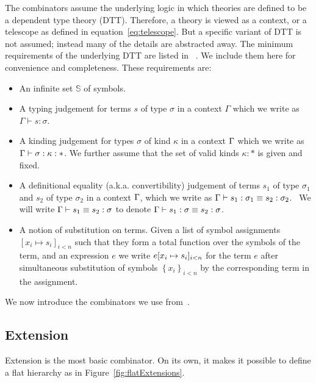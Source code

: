 The combinators assume the underlying logic in which theories are defined to be a dependent type theory (DTT). Therefore, a theory is viewed as a context, or a telescope as defined in equation~\ref{eq:telescope}. But a specific variant of DTT is not assumed; instead many of the details are abstracted away. The minimum requirements of the underlying DTT are listed in ~\cite{carette2018building}. We include them here for convenience and completeness. These requirements are:  
\begin{itemize}
    \item An infinite set $\mathbb{S}$ of symbols.
    
    \item A typing judgement for terms $s$ of type $\sigma$ in a context
    $\Gamma$ which we write as $\Gamma \vdash s : \sigma$.
    
    \item A kinding judgement for types $\sigma$ of kind $\kappa$ in a context
    $\Gamma$ which we write as \\
    $\Gamma \vdash \sigma : \kappa : *$.  We further assume that the set
    of valid kinds $\kappa : *$ is given and fixed.
    
    \item A definitional equality (a.k.a. convertibility) judgement of terms
    $s_1$ of type $\sigma_1$ and $s_2$ of type $\sigma_2$ in a context $\Gamma$,
    which we write as $\Gamma \vdash s_1 : \sigma_1 \equiv s_2 : \sigma_2$. \ We
    will write $\Gamma \vdash s_1 \equiv s_2 : \sigma$ to denote $\Gamma \vdash
    s_1 : \sigma \equiv s_2 : \sigma$.
    
    \item A notion of substitution on terms. Given a list of symbol
    assignments $[x_i \mapsto s_i]_{i < n}$ such that they form a total function over the symbols of the term, 
    and an expression $e$ we write $e[ x_i \mapsto s_i ]_{i < n}$
    for the term $e$ after simultaneous substitution of symbols $\left\{ x_i
    \right\}_{i < n}$ by the corresponding term in the assignment.
\end{itemize}

We now introduce the combinators we use from~\cite{carette2018building}.  
\subsection{Extension} 
\label{subsec:extension}
Extension is the most basic combinator. On its own, it makes it possible to define a flat hierarchy as in Figure~\ref{fig:flatExtensions}. 

